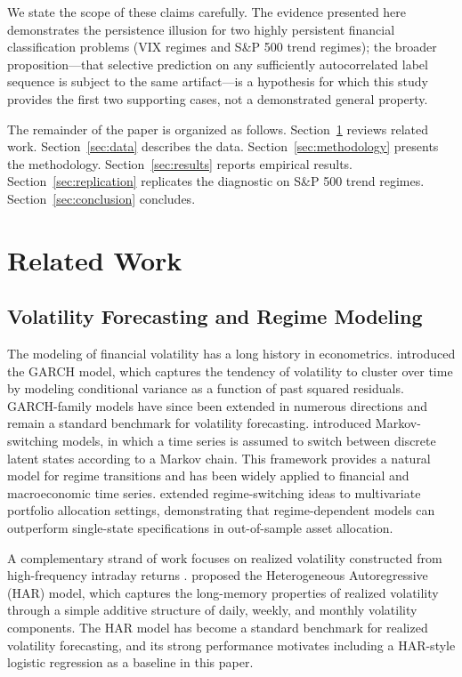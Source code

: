 \documentclass[12pt]{article}
\begin{document}
We state the scope of these claims carefully. The evidence presented here demonstrates the
persistence illusion for two highly persistent financial classification problems (VIX regimes
and S\&P 500 trend regimes); the broader proposition---that selective prediction on any
sufficiently autocorrelated label sequence is subject to the same artifact---is a hypothesis
for which this study provides the first two supporting cases, not a demonstrated general
property.

The remainder of the paper is organized as follows. Section~\ref{sec:related} reviews related
work. Section~\ref{sec:data} describes the data. Section~\ref{sec:methodology} presents the
methodology. Section~\ref{sec:results} reports empirical results. Section~\ref{sec:replication}
replicates the diagnostic on S\&P 500 trend regimes. Section~\ref{sec:conclusion} concludes.

\section{Related Work}
\label{sec:related}

\subsection{Volatility Forecasting and Regime Modeling}

The modeling of financial volatility has a long history in econometrics.
\citet{bollerslev1986} introduced the GARCH model, which captures the tendency of volatility
to cluster over time by modeling conditional variance as a function of past squared residuals.
GARCH-family models have since been extended in numerous directions and remain a standard
benchmark for volatility forecasting. \citet{hamilton1989} introduced Markov-switching models,
in which a time series is assumed to switch between discrete latent states according to a Markov
chain. This framework provides a natural model for regime transitions and has been widely applied
to financial and macroeconomic time series. \citet{guidolin2007} extended regime-switching ideas
to multivariate portfolio allocation settings, demonstrating that regime-dependent models can
outperform single-state specifications in out-of-sample asset allocation.

A complementary strand of work focuses on realized volatility constructed from high-frequency
intraday returns \citep{andersen2003}. \citet{corsi2009} proposed the Heterogeneous Autoregressive (HAR) model, which
captures the long-memory properties of realized volatility through a simple additive structure of
daily, weekly, and monthly volatility components. The HAR model has become a standard benchmark
for realized volatility forecasting, and its strong performance motivates including a HAR-style
logistic regression as a baseline in this paper.
\end{document}
